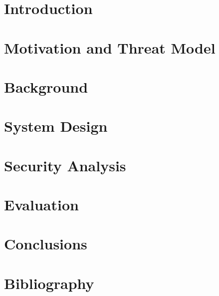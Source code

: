 \documentclass[a4paper,12pt]{article}
\author{Claudio Lucisano}
\date{}
\begin{document}
\begin{titlepage}

\end{titlepage}


\newpage
\tableofcontents
\newpage
\section{Introduction}

\newpage
\section{Motivation and Threat Model}\label{Motivation and Threat Model}

\newpage
\section{Background}\label{Background}

\newpage
\section{System Design}\label{System Design}

\newpage
\section{Security Analysis}\label{Security Analysis}

\newpage
\section{Evaluation}\label{Evaluation}

\newpage
\section{Conclusions}\label{Conclusions}

\newpage
\section{Bibliography}
\printbibliography
\end{document}
